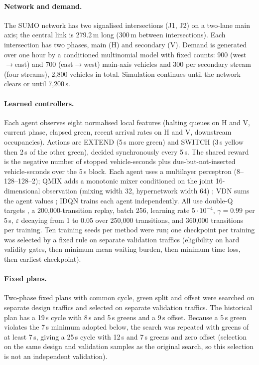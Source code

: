 \documentclass[11pt]{article}
\begin{document}
\paragraph{Network and demand.}
The SUMO \cite{lopez2018sumo} network has two signalised intersections (J1, J2) on a two-lane main axis;
the central link is 279.2\,m long (300\,m between intersections). Each intersection has two phases, main (H)
and secondary (V). Demand is generated over one hour by a conditioned multinomial model with fixed counts:
900 (west$\to$east) and 700 (east$\to$west) main-axis vehicles and 300 per secondary stream (four streams),
2{,}800 vehicles in total. Simulation continues until the network clears or until 7{,}200\,s.

\paragraph{Learned controllers.}
Each agent observes eight normalised local features (halting queues on H and V, current phase, elapsed
green, recent arrival rates on H and V, downstream occupancies). Actions are EXTEND (5\,s more green) and
SWITCH (3\,s yellow then 2\,s of the other green), decided synchronously every 5\,s. The shared reward is
the negative number of stopped vehicle-seconds plus due-but-not-inserted vehicle-seconds over the 5\,s
block. Each agent uses a multilayer perceptron (8--128--128--2); QMIX adds a monotonic mixer conditioned on
the joint 16-dimensional observation (mixing width 32, hypernetwork width 64) \cite{rashid2020qmix}; VDN sums
the agent values \cite{sunehag2018vdn}; IDQN trains each agent independently. All use double-Q targets
\cite{vanhasselt2016double}, a 200{,}000-transition replay, batch 256, learning rate $5\cdot10^{-4}$,
$\gamma=0.99$ per 5\,s, $\varepsilon$ decaying from 1 to 0.05 over 250{,}000 transitions, and
360{,}000 transitions per training. Ten training seeds per method were run; one checkpoint per training was
selected by a fixed rule on separate validation traffics (eligibility on hard validity gates, then minimum
mean waiting burden, then minimum time loss, then earliest checkpoint).

\paragraph{Fixed plans.}
Two-phase fixed plans with common cycle, green split and offset were searched on separate design traffics and
selected on separate validation traffics. The historical plan has a 19\,s cycle with 8\,s and 5\,s greens and
a 9\,s offset. Because a 5\,s green violates the 7\,s minimum adopted below, the search was repeated with
greens of at least 7\,s, giving a 25\,s cycle with 12\,s and 7\,s greens and zero offset (selection on the same
design and validation samples as the original search, so this selection is not an independent validation).
\end{document}
